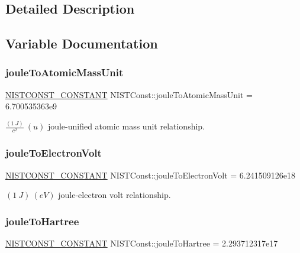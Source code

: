 \subsection{Detailed Description}


\subsection{Variable Documentation}
\mbox{\label{group___n_i_s_t_const-_joule_ga7e8cccc6b8aca9292bdaba28d92d0cc3}} 
\subsubsection{\texorpdfstring{joule\+To\+Atomic\+Mass\+Unit}{jouleToAtomicMassUnit}}
{\footnotesize\ttfamily \mbox{\hyperlink{_n_i_s_t_const_8hpp_a2b0fc1d7452373f816175dd86ce26729}{N\+I\+S\+T\+C\+O\+N\+S\+T\+\_\+\+C\+O\+N\+S\+T\+A\+NT}} N\+I\+S\+T\+Const\+::joule\+To\+Atomic\+Mass\+Unit = 6.\+700535363e9}

$\frac{(1\ J)}{c^2} \ (u)$ joule-\/unified atomic mass unit relationship. \mbox{\label{group___n_i_s_t_const-_joule_ga8a25948c1c135438783f418f669a9af6}} 
\subsubsection{\texorpdfstring{joule\+To\+Electron\+Volt}{jouleToElectronVolt}}
{\footnotesize\ttfamily \mbox{\hyperlink{_n_i_s_t_const_8hpp_a2b0fc1d7452373f816175dd86ce26729}{N\+I\+S\+T\+C\+O\+N\+S\+T\+\_\+\+C\+O\+N\+S\+T\+A\+NT}} N\+I\+S\+T\+Const\+::joule\+To\+Electron\+Volt = 6.\+241509126e18}

$(1\ J) \ (eV)$ joule-\/electron volt relationship. \mbox{\label{group___n_i_s_t_const-_joule_ga7a39b3d73c8112638347f756bc80f2d0}} 
\subsubsection{\texorpdfstring{joule\+To\+Hartree}{jouleToHartree}}
{\footnotesize\ttfamily \mbox{\hyperlink{_n_i_s_t_const_8hpp_a2b0fc1d7452373f816175dd86ce26729}{N\+I\+S\+T\+C\+O\+N\+S\+T\+\_\+\+C\+O\+N\+S\+T\+A\+NT}} N\+I\+S\+T\+Const\+::joule\+To\+Hartree = 2.\+293712317e17}

